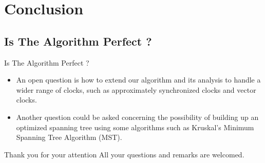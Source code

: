 \documentclass{beamer}
\begin{document}
\section{Conclusion}
\subsection{Is The Algorithm Perfect ?}
\begin{frame}{Is The Algorithm Perfect ?}
 \begin{itemize}
	\item  An open question is how to extend our algorithm and its analysis to handle a wider range of clocks, such as approximately synchronized clocks and vector clocks.
	\item Another question could be asked concerning the possibility of building up an optimized spanning tree using some algorithms such as Kruskal’s Minimum Spanning Tree Algorithm (MST).
 \end{itemize}

\end{frame}

\begin{frame}{Thank you for your attention}
	All your questions and remarks are welcomed.
\end{frame}
\end{document}
